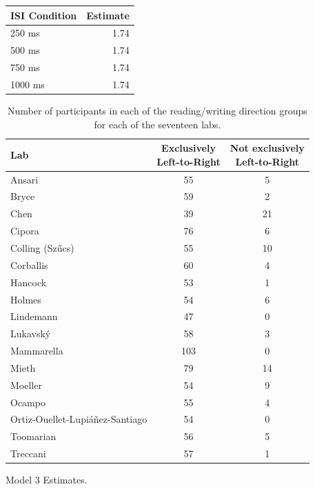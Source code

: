 \documentclass[man,floatsintext]{apa6}
\theoremstyle{definition}
\theoremstyle{definition}
\theoremstyle{definition}
\theoremstyle{remark}
\begin{document}
\begin{appendix}
\begin{table}[!p]
\begin{subtable}{\textwidth}
\begin{table}[H]
\begin{tabular}{lr}
\toprule
ISI Condition & Estimate\\
\midrule
250 ms & 1.74\\
500 ms & 1.74\\
750 ms & 1.74\\
1000 ms & 1.74\\
\bottomrule
\end{tabular}\endgroup{}
\end{table}
\end{subtable}
\end{table}

\begin{table}

\caption{\label{tab:read}Number of participants in each of the reading/writing direction groups for each of the seventeen labs.}
\centering
\begin{tabular}[t]{lcc}
\toprule
Lab & \makecell[c]{Exclusively\\Left-to-Right} & \makecell[c]{Not exclusively\\Left-to-Right}\\
\midrule
Ansari & 55 & 5\\
Bryce & 59 & 2\\
Chen & 39 & 21\\
Cipora & 76 & 6\\
Colling (Szűcs) & 55 & 10\\
Corballis & 60 & 4\\
Hancock & 53 & 1\\
Holmes & 54 & 6\\
Lindemann & 47 & 0\\
Lukavský & 58 & 3\\
Mammarella & 103 & 0\\
Mieth & 79 & 14\\
Moeller & 54 & 9\\
Ocampo & 55 & 4\\
Ortiz-Ouellet-Lupiáñez-Santiago & 54 & 0\\
Toomarian & 56 & 5\\
Treccani & 57 & 1\\
\bottomrule
\end{tabular}
\end{table}

\begin{table}[!p]
\caption{\label{tab:mod3}Model 3 Estimates.}
\begin{subtable}{\textwidth}
\centering
\begin{table}[H]\centering\begingroup\fontsize{10}{12}\selectfont


\end{table}
\end{subtable}
\end{table}
\end{appendix}
\end{document}
